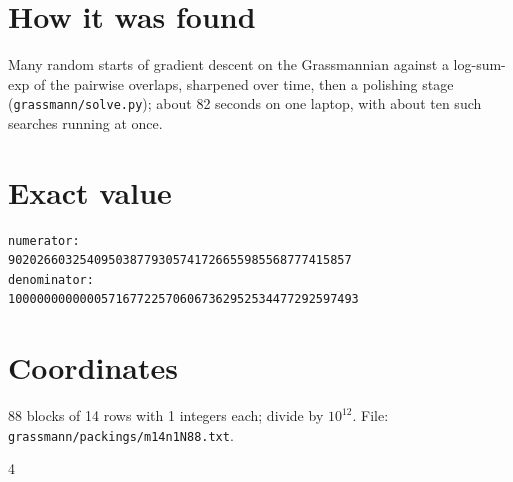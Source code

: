 \documentclass[11pt,a4paper]{article}
\begin{document}
\section{How it was found}
Many random starts of gradient descent on the Grassmannian against a log-sum-exp of the pairwise overlaps, sharpened over time, then a polishing stage (\texttt{grassmann/solve.py}); about 82 seconds on one laptop, with about ten such searches running at once.


\appendix
\section{Exact value}
{\small
\begin{verbatim}
numerator:
902026603254095038779305741726655985568777415857
denominator:
1000000000000571677225706067362952534477292597493
\end{verbatim}}

\section{Coordinates}
88 blocks of 14 rows with 1 integers each; divide by $10^{12}$. File: \texttt{grassmann/packings/m14n1N88.txt}.
{\tiny
\begin{multicols}{4}
\end{multicols}}
\end{document}
